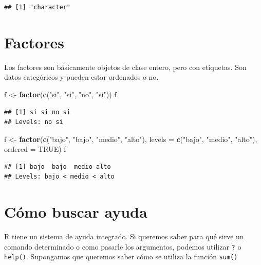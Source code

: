 \documentclass[spanish,]{book}
\newenvironment{Shaded}{\begin{snugshade}}{\end{snugshade}}
\newcommand{\KeywordTok}[1]{\textcolor[rgb]{0.13,0.29,0.53}{\textbf{#1}}}
\newcommand{\DataTypeTok}[1]{\textcolor[rgb]{0.13,0.29,0.53}{#1}}
\newcommand{\StringTok}[1]{\textcolor[rgb]{0.31,0.60,0.02}{#1}}
\newcommand{\OtherTok}[1]{\textcolor[rgb]{0.56,0.35,0.01}{#1}}
\newcommand{\NormalTok}[1]{#1}
\begin{document}
\begin{verbatim}
## [1] "character"
\end{verbatim}

\section{Factores}\label{factores}

Los factores son básicamente objetos de clase entero, pero con
etiquetas. Son datos categóricos y pueden estar ordenados o no.

\begin{Shaded}
\begin{Highlighting}[]
\NormalTok{f <-}\StringTok{ }\KeywordTok{factor}\NormalTok{(}\KeywordTok{c}\NormalTok{(}\StringTok{"si"}\NormalTok{, }\StringTok{"si"}\NormalTok{, }\StringTok{"no"}\NormalTok{, }\StringTok{"si"}\NormalTok{))}
\NormalTok{f}
\end{Highlighting}
\end{Shaded}

\begin{verbatim}
## [1] si si no si
## Levels: no si
\end{verbatim}

\begin{Shaded}
\begin{Highlighting}[]
\NormalTok{f <-}\StringTok{ }\KeywordTok{factor}\NormalTok{(}\KeywordTok{c}\NormalTok{(}\StringTok{"bajo"}\NormalTok{, }\StringTok{"bajo"}\NormalTok{, }\StringTok{"medio"}\NormalTok{, }\StringTok{"alto"}\NormalTok{),}
            \DataTypeTok{levels =} \KeywordTok{c}\NormalTok{(}\StringTok{"bajo"}\NormalTok{, }\StringTok{"medio"}\NormalTok{, }\StringTok{"alto"}\NormalTok{),}
            \DataTypeTok{ordered =} \OtherTok{TRUE}\NormalTok{)}
\NormalTok{f}
\end{Highlighting}
\end{Shaded}

\begin{verbatim}
## [1] bajo  bajo  medio alto 
## Levels: bajo < medio < alto
\end{verbatim}

\section{Cómo buscar ayuda}\label{como-buscar-ayuda}

R tiene un sistema de ayuda integrado. Si queremos saber para qué sirve
un comando determinado o como pasarle los argumentos, podemos utilizar
\texttt{?} o \texttt{help()}. Supongamos que queremos saber cómo se
utiliza la función \texttt{sum()}
\end{document}
